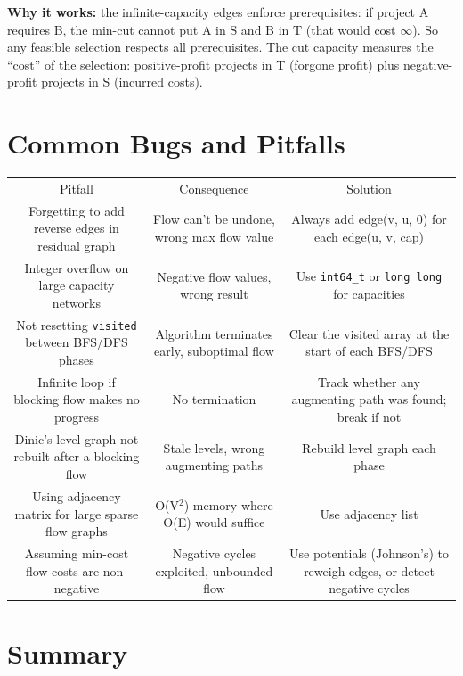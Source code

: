 \textbf{Why it works:} the infinite-capacity edges enforce prerequisites: if project A requires B, the min-cut cannot put A in S and B in T (that would cost $\infty$). So any feasible selection respects all prerequisites. The cut capacity measures the ``cost'' of the selection: positive-profit projects in T (forgone profit) plus negative-profit projects in S (incurred costs).

\section{Common Bugs and Pitfalls}

\begin{center}
\begin{tabular}{ccc}
\toprule
Pitfall & Consequence & Solution \\
Forgetting to add reverse edges in residual graph & Flow can't be undone, wrong max flow value & Always add edge(v, u, 0) for each edge(u, v, cap) \\
Integer overflow on large capacity networks & Negative flow values, wrong result & Use \texttt{int64\_t} or \texttt{long long} for capacities \\
Not resetting \texttt{visited} between BFS/DFS phases & Algorithm terminates early, suboptimal flow & Clear the visited array at the start of each BFS/DFS \\
Infinite loop if blocking flow makes no progress & No termination & Track whether any augmenting path was found; break if not \\
Dinic's level graph not rebuilt after a blocking flow & Stale levels, wrong augmenting paths & Rebuild level graph each phase \\
Using adjacency matrix for large sparse flow graphs & O(V$^{2}$) memory where O(E) would suffice & Use adjacency list \\
Assuming min-cost flow costs are non-negative & Negative cycles exploited, unbounded flow & Use potentials (Johnson's) to reweigh edges, or detect negative cycles \\

\bottomrule
\end{tabular}
\end{center}
\section{Summary}

